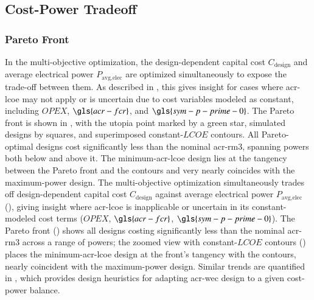 \subsection{Cost-Power Tradeoff}\label{remdo:sec:results-multi}
\subsubsection{Pareto Front}
\ifdefined\DISSERTATION
    In the multi-objective optimization, the design-dependent capital cost $C_{\text{design}}$ and average electrical power $P_{\text{avg},\text{elec}}$ are optimized simultaneously to expose the trade-off between them.
    As described in , this gives insight for cases where \gls{acr-lcoe} may not apply or is uncertain due to cost variables modeled as constant, including $OPEX$, $\gls{acr-fcr}$, and $\gls{sym-p-prime-0}$.
    The Pareto front is shown in , with the utopia point marked by a green star, simulated designs by squares, and superimposed constant-$LCOE$ contours. %
    All Pareto-optimal designs cost significantly less than the nominal \gls{acr-rm3}, spanning powers both below and above it.
    The minimum-\gls{acr-lcoe} design lies at the tangency between the Pareto front and the contours and very nearly coincides with the maximum-power design.
\else
    The multi-objective optimization simultaneously trades off design-dependent capital cost $C_{\text{design}}$ against average electrical power $P_{\text{avg},\text{elec}}$ (),
    giving insight where \gls{acr-lcoe} is inapplicable or uncertain in its constant-modeled cost terms ($OPEX$, $\gls{acr-fcr}$, $\gls{sym-p-prime-0}$).
    The Pareto front () shows all designs costing significantly less than the nominal \gls{acr-rm3} \citep{RM3} across a range of powers;
    the zoomed view with constant-$LCOE$ contours () places the minimum-\gls{acr-lcoe} design at the front's tangency with the contours, nearly coincident with the maximum-power design.
\fi
Similar trends are quantified in , which provides design heuristics for adapting \gls{acr-wec} design to a given cost-power balance.
